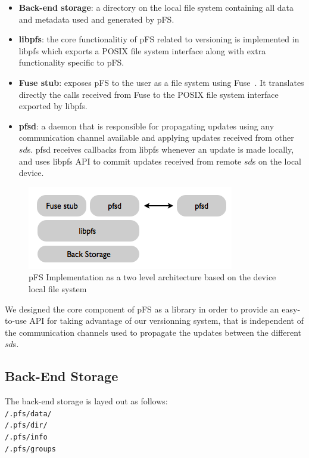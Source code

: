 \begin {itemize}
\item \textbf{Back-end storage}: a directory on the local file system
  containing all data and metadata used and generated by pFS.
\item \textbf{libpfs}: the core functionalitiy of pFS related to
  versioning is implemented in libpfs which exports a POSIX file
  system interface along with extra functionality specific to
  pFS.
\item \textbf{Fuse stub}: exposes pFS to the user as a file system
  using Fuse~\cite{henk:fuse}. It translates directly the calls
  received from Fuse to the POSIX file system interface exported by
  libpfs.
\item \textbf{pfsd}: a daemon that is responsible for propagating
  updates using any communication channel available and applying
  updates received from other $sd$s. pfsd receives callbacks from
  libpfs whenever an update is made locally, and uses libpfs API to
  commit updates received from remote $sd$s on the local device.
\end {itemize}

\begin{figure}[ht]
\begin{center}
  \includegraphics [scale=0.6] {img/impl}
  \caption{\label{PfsImpl} {\small pFS Implementation as a two level
      architecture based on the device local file system}}
\end{center}
\end{figure}

We designed the core component of pFS as a library in order to provide
an easy-to-use API for taking advantage of our versionning system, that
is independent of the communication channels used to propagate the
updates between the different $sd$s.

\subsection {Back-End Storage}

The back-end storage is layed out as follows: \\ 
{\tt /.pfs/data/} \\ 
{\tt /.pfs/dir/} \\ 
{\tt /.pfs/info} \\ 
{\tt /.pfs/groups} \\

